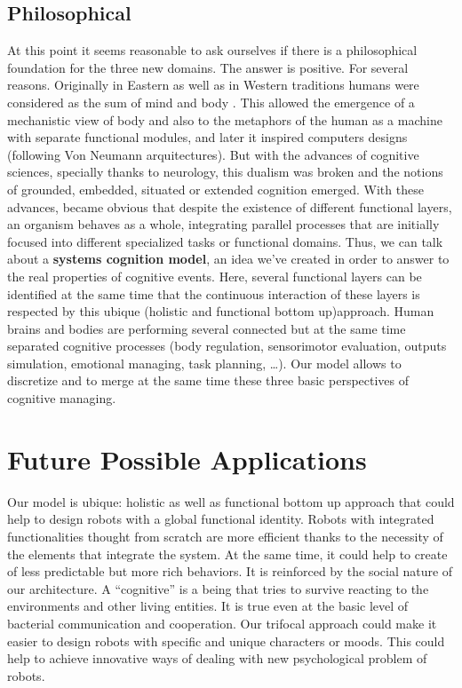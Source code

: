 \subsection{Philosophical}\label{philosophical}

At this point it seems reasonable to ask ourselves if there is a
philosophical foundation for the three new domains. The answer is
positive. For several reasons. Originally in Eastern as well as in
Western traditions humans were considered as the sum of mind and body
\cite{dualism}. This allowed the emergence of a mechanistic view of body
and also to the metaphors of the human as a machine with separate
functional modules, and later it inspired computers designs (following
Von Neumann arquitectures). But with the advances of cognitive sciences,
specially thanks to neurology, this dualism was broken and the notions
of grounded, embedded, situated or extended cognition emerged. With
these advances, became obvious that despite the existence of different
functional layers, an organism behaves as a whole, integrating parallel
processes that are initially focused into different specialized tasks or
functional domains. Thus, we can talk about a \textbf{systems cognition
model}, an idea we've created in order to answer to the real properties
of cognitive events. Here, several functional layers can be identified
at the same time that the continuous interaction of these layers is
respected by this ubique (holistic and functional bottom up)approach.
Human brains and bodies are performing several connected but at the same
time separated cognitive processes (body regulation, sensorimotor
evaluation, outputs simulation, emotional managing, task planning,
\ldots{}). Our model allows to discretize and to merge at the same time
these three basic perspectives of cognitive managing.

\section{Future Possible
Applications}\label{future-possible-applications}

Our model is ubique: holistic as well as functional bottom up approach
that could help to design robots with a global functional identity.
Robots with integrated functionalities thought from scratch are more
efficient thanks to the necessity of the elements that integrate the
system. At the same time, it could help to create of less predictable
but more rich behaviors. It is reinforced by the social nature of our
architecture. A ``cognitive'' is a being that tries to survive reacting
to the environments and other living entities. It is true even at the
basic level of bacterial communication and cooperation. Our trifocal
approach could make it easier to design robots with specific and unique
characters or moods. This could help to achieve innovative ways of
dealing with new psychological problem of robots.

